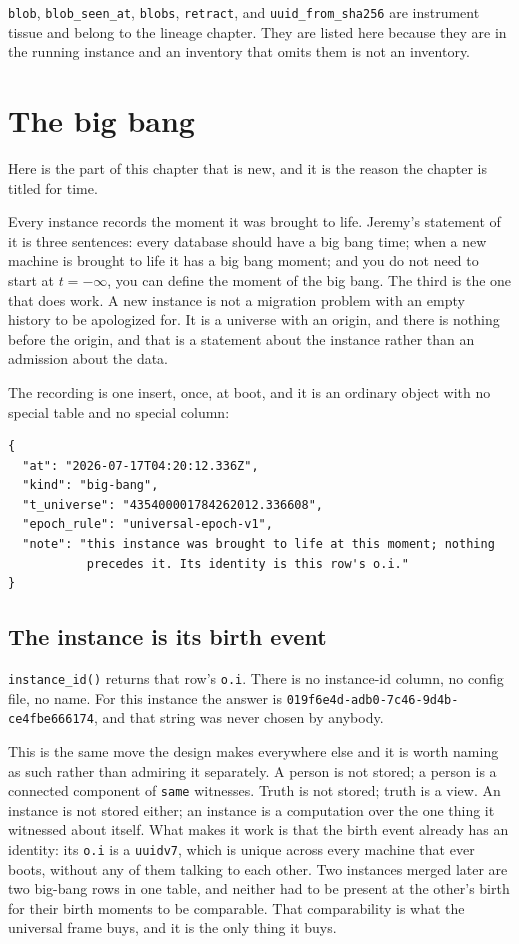 \texttt{blob}, \texttt{blob\_seen\_at}, \texttt{blobs}, \texttt{retract}, and \texttt{uuid\_from\_sha256} are instrument tissue and belong to the lineage chapter. They are listed here because they are in the running instance and an inventory that omits them is not an inventory.

\section{The big bang}

Here is the part of this chapter that is new, and it is the reason the chapter is titled for time.

Every instance records the moment it was brought to life. Jeremy's statement of it is three sentences: every database should have a big bang time; when a new machine is brought to life it has a big bang moment; and you do not need to start at $t = -\infty$, you can define the moment of the big bang. The third is the one that does work. A new instance is not a migration problem with an empty history to be apologized for. It is a universe with an origin, and there is nothing before the origin, and that is a statement about the instance rather than an admission about the data.

The recording is one insert, once, at boot, and it is an ordinary object with no special table and no special column:

\begin{verbatim}
{
  "at": "2026-07-17T04:20:12.336Z",
  "kind": "big-bang",
  "t_universe": "435400001784262012.336608",
  "epoch_rule": "universal-epoch-v1",
  "note": "this instance was brought to life at this moment; nothing
           precedes it. Its identity is this row's o.i."
}
\end{verbatim}

\subsection{The instance is its birth event}

\texttt{instance\_id()} returns that row's \texttt{o.i}. There is no instance-id column, no config file, no name. For this instance the answer is \texttt{019f6e4d-adb0-7c46-9d4b-ce4fbe666174}, and that string was never chosen by anybody.

This is the same move the design makes everywhere else and it is worth naming as such rather than admiring it separately. A person is not stored; a person is a connected component of \texttt{same} witnesses. Truth is not stored; truth is a view. An instance is not stored either; an instance is a computation over the one thing it witnessed about itself. What makes it work is that the birth event already has an identity: its \texttt{o.i} is a \texttt{uuidv7}, which is unique across every machine that ever boots, without any of them talking to each other. Two instances merged later are two big-bang rows in one table, and neither had to be present at the other's birth for their birth moments to be comparable. That comparability is what the universal frame buys, and it is the only thing it buys.


